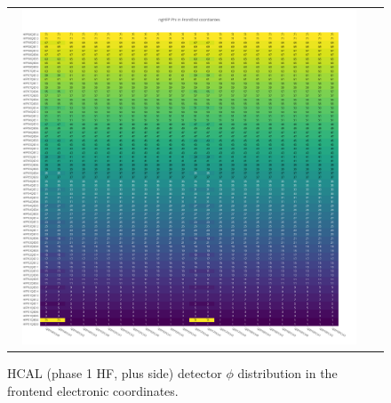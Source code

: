 \begin{figure}[htb]
 \begin{center}
  \begin{tabular}{cc}
   \includegraphics[angle=0,width=0.95\textwidth]{figures/appendix/ngHFP_Phi_in_FrontEnd.png}
  \end{tabular}
	\caption{HCAL (phase 1 HF, plus side) detector $\phi$ distribution in the frontend electronic coordinates.}
  \label{fig:lmapngHFPPhiFEC}
 \end{center}
\end{figure}
\clearpage

